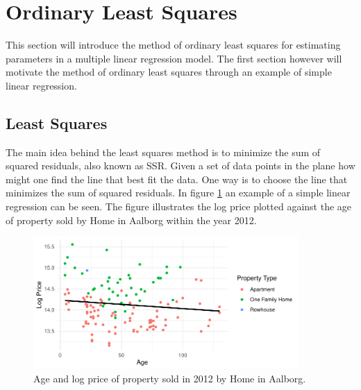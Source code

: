 \section{Ordinary Least Squares}
This section will introduce the method of ordinary least squares for estimating parameters in a multiple linear regression model.
The first section however will motivate the method of ordinary least squares through an example of simple linear regression.

\subsection{Least Squares}
The main idea behind the least squares method is to minimize the sum of squared residuals, also known as SSR. 
Given a set of data points in the plane how might one find the line that best fit the data. 
One way is to choose the line that minimizes the sum of squared residuals.
In figure \ref{fig:example_simple_linear_regression} an example of a simple linear regression can be seen. 
The figure illustrates the log price plotted against the age of property sold by Home in Aalborg within the year 2012.

\begin{figure}[h]
    \centering
    \includegraphics[width = 0.9\textwidth]{figures/Ordinary_Least_Squares/example_linear_regression.pdf}
    \caption{Age and log price of property sold in 2012 by Home in Aalborg.}
    \label{fig:example_simple_linear_regression}
\end{figure}

